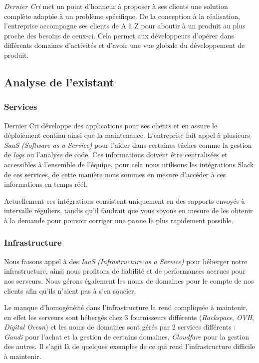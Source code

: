 \documentclass[11pt,a4paper]{article}
\begin{document}
  \emph{Dernier Cri} met un point d'honneur à proposer à ses clients une
  solution complète adaptée à un problème spécifique. De la conception à
  la réalisation, l'entreprise accompagne ses clients de A à Z pour
  aboutir à un produit au plus proche des besoins de ceux-ci. Cela permet
  aux développeurs d'opérer dans différents domaines d'activités et
  d'avoir une vue globale du développement de produit.

  \newpage

  \subsection{Analyse de l'existant}\label{analyse-de-lexistant}

  \subsubsection{Services}\label{services}

  Dernier Cri développe des applications pour ses clients et en assure le
  déploiement continu ainsi que la maintenance. L'entreprise fait appel à
  plusieurs \emph{SaaS} \emph{(Software as a Service)} pour l'aider dans
  certaines tâches comme la gestion de \emph{logs} ou l'analyse de code.
  Ces informations doivent être centralisées et accessibles à l'ensemble
  de l'équipe, pour cela nous utilisons les intégrations Slack de ces
  services, de cette manière nous sommes en mesure d'accéder à ces
  informations en temps réél.

  \bigskip

  Actuellement ces intégrations consistent uniquement en des rapports
  envoyés à intervalle réguliers, tandis qu'il faudrait que vous soyons en
  mesure de les obtenir à la demande pour pouvoir corriger une panne le
  plus rapidement possible.

  \subsubsection{Infrastructure}\label{infrastructure}

  Nous faisons appel à des \emph{IaaS} \emph{(Infrastructure as a
  Service)} pour héberger notre infrastructure, ainsi nous profitons de
  fiabilité et de performances accrues pour nos serveurs. Nous gérons
  également les noms de domaines pour le compte de nos clients afin qu'ils
  n'aient pas à s'en soucier.

  \bigskip

  Le manque d'homogénéité dans l'infrastructure la rend compliquée à
  maintenir, en effet les serveurs sont hébergés chez 3 fournisseurs
  différents (\emph{Rackspace}, \emph{OVH}, \emph{Digital Ocean}) et les
  noms de domaines sont gérés par 2 services différents : \emph{Gandi}
  pour l'achat et la gestion de certains domaines, \emph{Cloudfare} pour
  la gestion des autres. Il s'agit là de quelques exemples de ce qui rend
  l'infrastructure difficile à maintenir.
\end{document}
